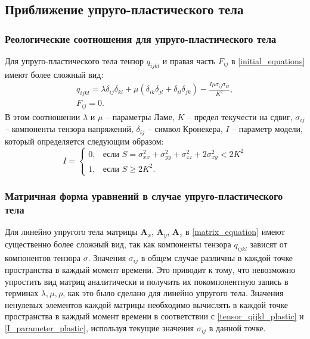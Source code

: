 
\clearpage
\newpage

\subsection{Приближение упруго-пластического тела}

\subsubsection{Реологические соотношения для упруго-пластического тела}

Для упруго-пластического тела тензор $q_{ijkl}$ и правая часть $F_{ij}$ в \ref{initial_equations} имеют более сложный вид:
\begin{eqnarray}
\label{tensor_qijkl_plastic}
q_{ijkl}=\lambda\delta_{ij}\delta_{kl}+\mu(\delta_{ik}\delta_{jl}+\delta_{il}\delta_{jk})-\frac{I\mu\sigma_{ij}\sigma_{kl}}{K^2},
\nonumber\\
F_{ij}=0.
\end{eqnarray}
В этом соотношении $\lambda$ и $\mu$ -- параметры Ламе, $K$ -- предел текучести на сдвиг, $\sigma_{ij}$ -- компоненты тензора напряжений, $\delta_{ij}$ -- символ Кронекера, $I$ -- параметр модели, который определяется следующим образом:
\begin{equation}
\label{I_parameter_plastic}
I=\begin{cases}
0, & \text{если $S = \sigma_{xx}^2+\sigma_{yy}^2+\sigma_{zz}^2+2\sigma_{xy}^2 < 2K^2$}\\
1, & \text{если $S \ge 2K^2$}.
\end{cases}
\end{equation}

\subsubsection{Матричная форма уравнений в случае упруго-пластического тела}
\label{plastic_matrixes}

Для линейно упругого тела матрицы $\mathbf{A}_x$, $\mathbf{A}_y$, $\mathbf{A}_z$ в \ref{matrix_equation} имеют существенно более сложный вид, так как компоненты тензора $q_{ijkl}$ зависят от компонентов тензора $\sigma$. Значения $\sigma_{ij}$ в общем случае различны в каждой точке пространства в каждый момент времени. Это приводит к тому, что невозможно упростить вид матриц аналитически и получить их покомпонентную запись в терминах $\lambda, \mu, \rho$, как это было сделано для линейно упругого тела. Значения ненулевых элементов каждой матрицы необходимо вычислять в каждой точке пространства в каждый момент времени в соответствии с \ref{tensor_qijkl_plastic} и \ref{I_parameter_plastic}, используя текущие значения $\sigma_{ij}$ в данной точке.

